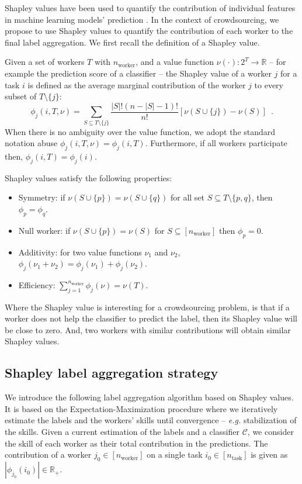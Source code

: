 \documentclass{cap2024}
\begin{document}
Shapley values have been used to quantify the contribution of individual features in machine learning models' prediction \citep{molnar2020interpretable}.
In the context of crowdsourcing, we propose to use Shapley values to quantify the contribution of each worker to the final label aggregation.
We first recall the definition of a Shapley value.

\begin{definition}
Given a set of workers $T$ with $n_\text{worker}$, and a value function $\nu(\cdot): 2^T\rightarrow \mathbb{R}$ -- for example the prediction score of a classifier -- the Shapley value of a worker $j$ for a task $i$ is defined as the average marginal contribution of the worker $j$ to every subset of $T\setminus\{j\}$:
\begin{equation}
  \phi_j(i, T, \nu) = \sum_{S\subseteq T\setminus\{j\}} \frac{|S|!(n-|S|-1)!}{n!} \left[\nu(S\cup\{j\}) - \nu(S)\right]\enspace.
\end{equation}
When there is no ambiguity over the value function, we adopt the standard notation abuse $\phi_j(i, T, \nu)=\phi_j(i, T)$. Furthermore, if all workers participate then, $\phi_j(i, T)=\phi_j(i)$.
\end{definition}
Shapley values satisfy the following properties:
\begin{itemize}
  \item Symmetry: if $\nu(S\cup\{p\})=\nu(S\cup\{q\})$ for all set $S\subseteq T\setminus\{p,q\}$, then $\phi_p=\phi_q$.
  \item Null worker: if $\nu(S\cup\{p\})=\nu(S)$ for $S\subseteq [n_\text{worker}]$ then $\phi_p=0$.
  \item Additivity: for two value functions $\nu_1$ and $\nu_2$, $\phi_j(\nu_1+\nu_2)=\phi_j(\nu_1)+\phi_j(\nu_2)$.
  \item Efficiency: $\sum_{j=1}^{n_\text{worker}} \phi_j(\nu)=\nu(T)$.
\end{itemize}

Where the Shapley value is interesting for a crowdsourcing problem, is that if a worker does not help the classifier to predict the label, then its Shapley value will be close to zero. And, two workers with similar contributions will obtain similar Shapley values.

\subsection{Shapley label aggregation strategy}

We introduce the following label aggregation algorithm based on Shapley values.
It is based on the Expectation-Maximization procedure where we iteratively estimate the labels and the workers' skills until convergence -- \emph{e.g.} stabilization of the skills.
Given a current estimation of the labels and a classifier $\mathcal{C}$, we consider the skill of each worker as their total contribution in the predictions.
The contribution of a worker $j_0\in[n_\text{worker}]$ on a single task $i_0\in [n_\text{task}]$ is given as $|\phi_{j_0}(i_0)|\in\mathbb{R}_+$.
\end{document}
